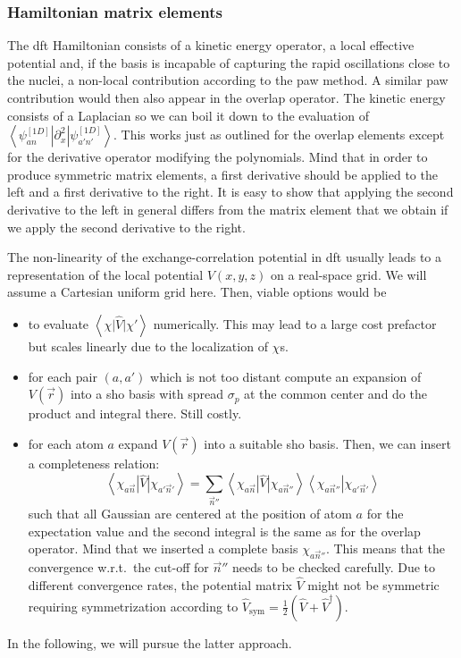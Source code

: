 \documentclass[oribibl]{llncs}
\newcommand{\um}[1]{_{\mathrm{#1}}}
\newcommand{\braket}[2]{\left\langle \left. #1 \right| #2 \right\rangle}
\newcommand{\braketop}[3]{\left\langle \left. #1 \right| #2 \left| #3 \right. \right\rangle}
\begin{document}
\subsubsection{Hamiltonian matrix elements}
The \ac{dft} Hamiltonian consists of a kinetic energy operator,
a local effective potential 
and, if the basis is incapable of
capturing the rapid oscillations close to the nuclei,
a non-local contribution according to the \ac{paw} method.
A similar \ac{paw} contribution would then also appear in the overlap operator.
The kinetic energy consists of a Laplacian so we can boil it down to the evaluation
of $\braketop{ \psi^{[1D]}_{an} }{ \partial^2_x }{ \psi^{[1D]}_{a'n'} }$.
This works just as outlined for the overlap elements
except for the derivative operator modifying the polynomials.
Mind that in order to produce symmetric matrix elements,
a first derivative should be applied to the left and a first derivative to the right.
It is easy to show that applying the second derivative to the left in general differs from
the matrix element that we obtain if we apply the second derivative to the right.

The non-linearity of the exchange-correlation potential in \ac{dft} usually
leads to a representation of the local potential $V(x,y,z)$ on a real-space grid.
We will assume a Cartesian uniform grid here.
Then, viable options would be
\begin{itemize}
%
\item to evaluate $\braketop{ \chi }{ \hat V }{ \chi' }$ numerically. 
This may lead to a large cost prefactor but scales linearly due to the localization of $\chi$s.
%
\item for each pair $(a,a')$ which is not too distant
compute an expansion of $V(\vec r)$ into a \ac{sho} basis with spread $\sigma_p$
at the common center and do the product and integral there. Still costly.
%
\item for each atom $a$ expand $V(\vec r)$ into a suitable \ac{sho} basis. 
Then, we can insert a completeness relation: %
\begin{equation}
 \braketop{ \chi_{a\vec n} }{ \hat V }{ \chi_{a'\vec n'} } = \sum_{\vec n''}
 \braketop{ \chi_{a\vec n} }{ \hat V }{ \chi_{a\vec n''} } \braket{ \chi_{a\vec n''} }{ \chi_{a'\vec n'} }
\end{equation}
such that all Gaussian are centered at the position of atom $a$ for the expectation value
and the second integral is the same as for the overlap operator.
Mind that we inserted a complete basis $\chi_{a\vec n''}$. 
This means that the convergence w.r.t.~the cut-off for $\vec n''$ needs to be checked carefully.
Due to different convergence rates, the potential matrix $\hat V$ might not be symmetric
requiring symmetrization according to $\hat V\um{sym} = \frac 12 \left( \hat V + \hat V^\dagger \right)$.
%
\end{itemize}
In the following, we will pursue the latter approach.
\end{document}

